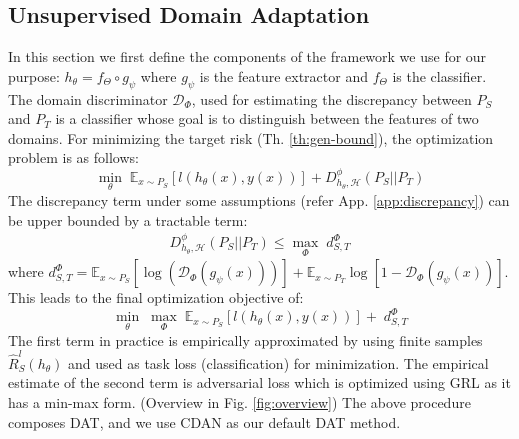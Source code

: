 \documentclass[table,dvipsnames]{article}
\theoremstyle{plain}
\theoremstyle{definition}
\theoremstyle{remark}
\begin{document}
\subsection{Unsupervised Domain Adaptation}
In this section we first define the components of the framework we use for our purpose: $h_{\theta} = f_{\Theta} \circ g_{\psi}$ where $g_{\psi}$ is the feature extractor  and $f_{\Theta}$ is the classifier. The domain discriminator $\mathcal{D}_{\Phi}$, used for estimating the discrepancy between $P_S$ and $P_T$ is a classifier whose goal is to distinguish between the features of two domains. For minimizing the target risk (Th. \ref{th:gen-bound}), the optimization problem is as follows:
\begin{equation}
    \underset{\theta}{\min} \; \mathbb{E}_{x \sim P_S}[l(h_{\theta}(x), y(x))] + D_{h_{\theta}, \mathcal{H}}^{\phi}(P_S||P_T)
    \label{eq:uda_obj_min}
\end{equation}
The discrepancy term under some assumptions (refer App. \ref{app:discrepancy}) can be upper bounded by a tractable term:
\begin{equation}
\begin{split}
        D_{h_{\theta}, \mathcal{H}}^{\phi}(P_S||P_T) \leq \underset{\Phi}{\max} \; d_{S,T}^{\Phi}
\end{split}
\label{eq:diver_disc}
\end{equation}
where 
$d_{S,T}^{\Phi} = \mathbb{E}_{x \sim P_S}[\log(\mathcal{D}_{\Phi}(g_{\psi}(x)))] + \mathbb{E}_{x \sim P_T}\log[1 - \mathcal{D}_{\Phi}(g_{\psi}(x))]$.
This leads to the final optimization objective of:
\begin{equation}
        \underset{\theta}{\min} \; \underset{\Phi}{\max} \; \mathbb{E}_{x \sim P_S}[l(h_{\theta}(x), y(x))] +  \; d_{S,T}^{\Phi}
\label{eq:uda_obj}
\end{equation}
The first term in practice is empirically approximated by using finite samples $\hat{R}_S^l(h_\theta)$ and used as {task} loss (classification) for minimization. The empirical estimate of the second term is adversarial loss which is optimized using GRL as it has a min-max form. (Overview in Fig. \ref{fig:overview}) The above procedure composes DAT, and we use CDAN \citep{long2018conditional} as our default DAT method.
\end{document}
